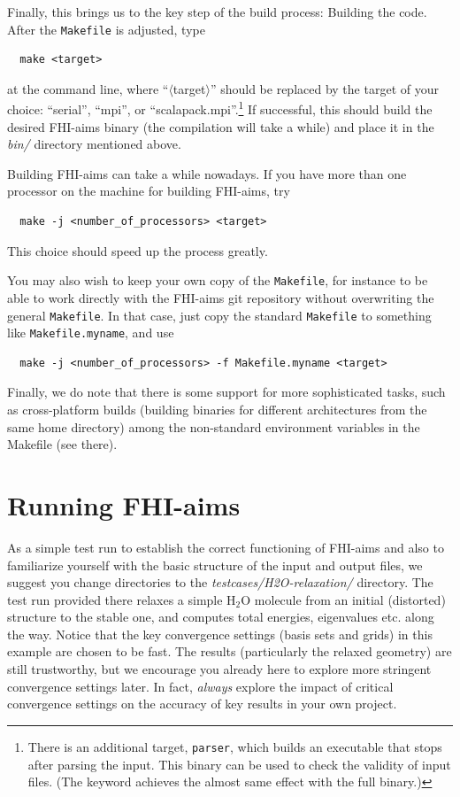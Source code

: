 Finally, this brings us to the key step of the build process: Building the
code. After the \texttt{Makefile} is adjusted, type

\begin{verbatim}
  make <target>
\end{verbatim}

at the command line, where ``$\langle$target$\rangle$'' should be replaced by
the target of your choice: 
``serial'', ``mpi'', or ``scalapack.mpi''.\footnote{There is an
  additional target, \texttt{parser}, which builds an executable 
that stops after parsing the input. This binary can be used to check the
validity of input files. (The  keyword achieves the
almost same effect with the full binary.)
} 
If successful, this should build
the desired FHI-aims binary (the compilation will take a while) and place it
in the \emph{bin/} directory mentioned above.

Building FHI-aims can take a while nowadays. If you have more than one
processor on the machine for building FHI-aims, try

\begin{verbatim}
  make -j <number_of_processors> <target>
\end{verbatim}

This choice should speed up the process greatly.

You may also wish to keep your own copy of the \texttt{Makefile}, for
instance to be able to work directly with the FHI-aims git repository
without overwriting the general \texttt{Makefile}. In that case, just
copy the standard \texttt{Makefile} to something like
\texttt{Makefile.myname}, and use 

\begin{verbatim}
  make -j <number_of_processors> -f Makefile.myname <target>
\end{verbatim}

Finally, we do note that there is some support for more sophisticated
tasks, such as cross-platform builds (building binaries for different
architectures from the same home directory) among the non-standard
environment variables in the Makefile (see there). 

\section{Running FHI-aims}
\label{Sec:running}


As a simple test run to establish the correct functioning of FHI-aims and also
to familiarize yourself with the basic structure of the input and output
files, we suggest you change directories to the
\emph{testcases/H2O-relaxation/} directory. The test run provided there relaxes
a simple H$_2$O molecule from an initial (distorted) structure to the stable
one, and computes total energies, eigenvalues etc. along the way. Notice that
the key convergence settings (basis sets and grids) in this example are chosen
to be fast. The results (particularly the relaxed geometry) are still
trustworthy, but we encourage you already here to explore more
stringent convergence settings later. In fact, \emph{always} explore the
impact of critical convergence settings on the accuracy of key results in your
own project.

